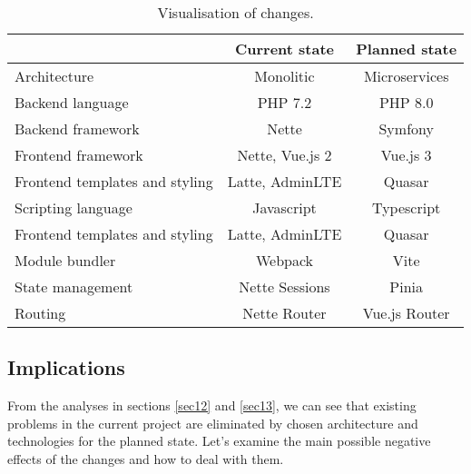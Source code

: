\begin{table}[ht]
\begin{tabular}{l|c|c|}
\textbf{}                                            & \textbf{Current state} & \textbf{Planned state} \\ \hline
\multicolumn{1}{|l|}{Architecture}                   & Monolitic              & Microservices          \\ \hline
\multicolumn{1}{|l|}{Backend language}               & PHP 7.2                & PHP 8.0                \\ \hline
\multicolumn{1}{|l|}{Backend framework}              & Nette                  & Symfony                \\ \hline
\multicolumn{1}{|l|}{Frontend framework}             & Nette, Vue.js 2        & Vue.js 3               \\ \hline
\multicolumn{1}{|l|}{Frontend templates and styling} & Latte, AdminLTE        & Quasar                 \\ \hline
\multicolumn{1}{|l|}{Scripting language}             & Javascript             & Typescript             \\ \hline
\multicolumn{1}{|l|}{Frontend templates and styling} & Latte, AdminLTE        & Quasar                 \\ \hline
\multicolumn{1}{|l|}{Module bundler}                 & Webpack                & Vite                   \\ \hline
\multicolumn{1}{|l|}{State management}               & Nette Sessions         & Pinia                  \\ \hline
\multicolumn{1}{|l|}{Routing}                        & Nette Router           & Vue.js Router          \\ \hline
\end{tabular}
\caption{\label{demo-table}Visualisation of changes.}
\end{table}

\subsection{Implications} From the analyses in sections \ref{sec12} and \ref{sec13}, we can see that existing problems in the current project are eliminated by chosen architecture and technologies for the planned state. Let's examine the main possible negative effects of the changes and how to deal with them.

